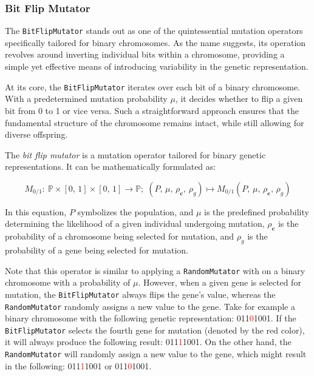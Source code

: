 
\subsubsection{Bit Flip Mutator}
\label{sec:keen:op:mut:bit_flip}

  The \texttt{BitFlipMutator} stands out as one of the quintessential mutation 
  operators specifically tailored for binary chromosomes. As the name suggests, 
  its operation revolves around inverting individual bits within a chromosome, 
  providing a simple yet effective means of introducing variability in the 
  genetic representation.

  At its core, the \texttt{BitFlipMutator} iterates over each bit of a binary 
  chromosome. With a predetermined mutation probability \( \mu \), it decides 
  whether to flip a given bit from 0 to 1 or vice versa. Such a straightforward 
  approach ensures that the fundamental structure of the chromosome remains 
  intact, while still allowing for diverse offspring.

  \begin{definition}
    The \emph{bit flip mutator} is a mutation operator tailored for binary 
    genetic representations. It can be mathematically formulated as:

    \begin{equation}
      M_{0/1} :\: \mathbb{P} \times [0,\, 1] \times [0,\, 1] \to \mathbb{P};\;
      (P,\, \mu,\, \rho_\mathbf{c},\, \rho_g) 
        \mapsto M_{0/1}(P,\, \mu,\, \rho_\mathbf{c},\, \rho_g)
    \end{equation}

    In this equation, \(P\) symbolizes the population, and \(\mu\) is the 
    predefined probability determining the likelihood of a given individual
    undergoing mutation, \(\rho_\mathbf{c}\) is the probability of a chromosome
    being selected for mutation, and \(\rho_g\) is the probability of a gene
    being selected for mutation.
  \end{definition}

  Note that this operator is similar to applying a \texttt{RandomMutator} with 
  on a binary chromosome with a probability of \(\mu\). However, when a given
  gene is selected for mutation, the \texttt{BitFlipMutator} always flips the
  gene's value, whereas the \texttt{RandomMutator} randomly assigns a new value
  to the gene. Take for example a binary chromosome with the following genetic
  representation: 011\textcolor{red}{0}1001. If the \texttt{BitFlipMutator}
  selects the fourth gene for mutation (denoted by the red color), it will
  always produce the following result: 011\textcolor{red}{1}1001. On the other
  hand, the \texttt{RandomMutator} will randomly assign a new value to the
  gene, which might result in the following: 011\textcolor{red}{1}1001 or
  011\textcolor{red}{0}1001.


